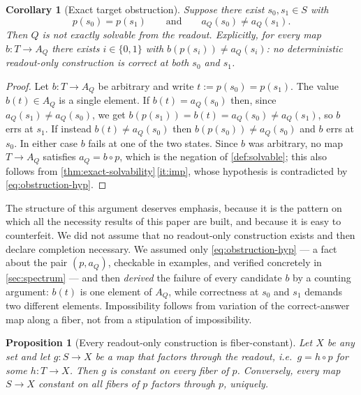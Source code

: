 \documentclass[11pt,reqno]{amsart}
\theoremstyle{plain}
\newtheorem{proposition}[theorem]{Proposition}
\newtheorem{corollary}[theorem]{Corollary}
\theoremstyle{definition}
\newcommand{\Src}{S}
\newcommand{\Rdt}{T}
\begin{document}
\begin{corollary}[Exact target obstruction]\label{cor:obstruction}
Suppose there exist $s_0,s_1\in\Src$ with
\begin{equation}\label{eq:obstruction-hyp}
p(s_0)=p(s_1)
\qquad\text{and}\qquad
a_Q(s_0)\neq a_Q(s_1).
\end{equation}
Then $Q$ is not exactly solvable from the readout. Explicitly, for every map
$b\colon\Rdt\to A_Q$ there exists $i\in\{0,1\}$ with $b(p(s_i))\neq a_Q(s_i)$: no deterministic
readout-only construction is correct at both $s_0$ and $s_1$.
\end{corollary}

\begin{proof}
Let $b\colon\Rdt\to A_Q$ be arbitrary and write $t:=p(s_0)=p(s_1)$. The value $b(t)\in A_Q$ is a
single element. If $b(t)=a_Q(s_0)$ then, since $a_Q(s_1)\neq a_Q(s_0)$, we get
$b(p(s_1))=b(t)=a_Q(s_0)\neq a_Q(s_1)$, so $b$ errs at $s_1$. If instead $b(t)\neq a_Q(s_0)$
then $b(p(s_0))\neq a_Q(s_0)$ and $b$ errs at $s_0$. In either case $b$ fails at one of the two
states. Since $b$ was arbitrary, no map $\Rdt\to A_Q$ satisfies $a_Q=b\circ p$, which is the
negation of \cref{def:solvable}; this also follows from
\cref{thm:exact-solvability}\,\eqref{it:imp}, whose hypothesis is contradicted by
\eqref{eq:obstruction-hyp}.
\end{proof}

The structure of this argument deserves emphasis, because it is the pattern on which all the
necessity results of this paper are built, and because it is easy to counterfeit. We did not
assume that no readout-only construction exists and then declare completion necessary. We assumed
only \eqref{eq:obstruction-hyp} --- a fact about the pair $(p,a_Q)$, checkable in examples, and
verified concretely in \cref{sec:spectrum} --- and then \emph{derived} the failure of every
candidate $b$ by a counting argument: $b(t)$ is one element of $A_Q$, while correctness at $s_0$
and $s_1$ demands two different elements. Impossibility follows from variation of the
correct-answer map along a fiber, not from a stipulation of impossibility.

\begin{proposition}[Every readout-only construction is fiber-constant]\label{prop:fiberconst-form}
Let $X$ be any set and let $g\colon\Src\to X$ be a map that \emph{factors through the readout},
i.e.\ $g=h\circ p$ for some $h\colon\Rdt\to X$. Then $g$ is constant on every fiber of $p$.
Conversely, every map $\Src\to X$ constant on all fibers of $p$ factors through $p$, uniquely.
\end{proposition}
\end{document}
